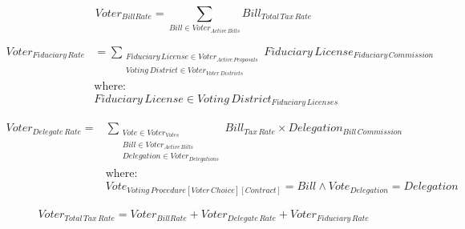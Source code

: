 \documentclass[fleqn]{article}
\begin{document}
	
	\Large
	
	\begin{equation}
		Voter_{Bill Rate} = \displaystyle\sum_{Bill \in Voter_{Active \, Bills}} Bill_{Total \, Tax \, Rate}
	\end{equation}
		
	\begin{equation}
		\begin{split}
			Voter_{Fiduciary \, Rate} &= \displaystyle\sum_{
				\substack{
					Fiduciary \, License \in Voter_{Active \, Proposals} \\
					Voting \, District \in Voter_{Voter \, Districts}}
				} Fiduciary \, License_{Fiduciary \, Commission} \\
			& \text{where:} \\
			& Fiduciary \, License \in Voting \, District_{Fiduciary \, Licenses}
		\end{split}	
	\end{equation}
	
	\begin{equation}
	\begin{split}
	Voter_{Delegate \, Rate} = &\displaystyle\sum_{
		\substack{
			Vote \in Voter_{Votes} \\
			Bill \in Voter_{Active \, Bills} \\
			Delegation \in Voter_{Delegations}} 
	} Bill_{Tax \, Rate} \times Delegation_{Bill \, Commission} \\
	&\text{where:} \\
	&Vote_{Voting \, Procedure[Voter \, Choice][Contract]} = Bill \land Vote_{Delegation} = Delegation
	\end{split}
	\end{equation}
	
	\begin{equation}
		Voter_{Total \, Tax \, Rate} = Voter_{Bill Rate} + Voter_{Delegate \, Rate} + Voter_{Fiduciary \, Rate}
	\end{equation}
\end{document}
